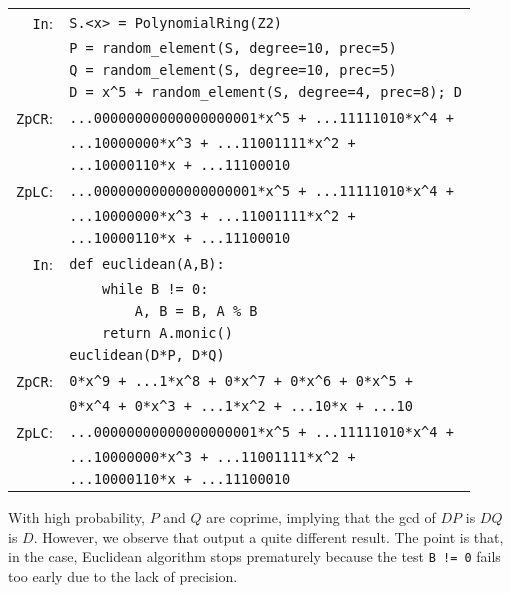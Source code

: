 \documentclass[sigconf]{acmart}
\newcommand{\ZpCR}{\text{\color{output} \rm \tt ZpCR}\xspace}
\newcommand{\cIn}{{\color{input} \tt \phantom{Zp}In}:}
\newcommand{\cZpCR}{{\color{output} \tt ZpCR}:}
\newcommand{\cZpLC}{{\color{output} \tt ZpLC}:}
\theoremstyle{definition}
\begin{document}
{\noindent \small
\begin{tabular}{@{}rl}
\cIn
 & \verb?S.<x> = ?{\color{constructor}\verb?PolynomialRing?}\verb?(?{\color{ring}\verb?Z2?}\verb?)? \\
 & \verb?P = ?{\color{function}\verb?random_element?}\verb?(S, degree=10, prec=5)? \\
 & \verb?Q = ?{\color{function}\verb?random_element?}\verb?(S, degree=10, prec=5)? \\
 & \verb?D = x^5 + ?{\color{function}\verb?random_element?}\verb?(S, degree=4, prec=8); D? \\
\cZpCR
 & \verb?...00000000000000000001*x^5 + ...11111010*x^4 +? \\ 
 & \verb?...10000000*x^3 + ...11001111*x^2 +? \\
 & \verb?...10000110*x + ...11100010? \\
\cZpLC
 & \verb?...00000000000000000001*x^5 + ...11111010*x^4 +? \\ 
 & \verb?...10000000*x^3 + ...11001111*x^2 +? \\
 & \verb?...10000110*x + ...11100010? \\
\cIn
 & {\color{keyword}\verb?def?}\verb? ?{\color{function}\verb?euclidean?}\verb?(A,B):? \\
 & \verb?    ?{\color{keyword}\verb?while?}\verb? B != 0:? \\
 & \verb?        A, B = B, A % B? \\
 & \verb?    ?{\color{keyword}\verb?return?}\verb? A.monic()? \\
 & {\color{function}\verb?euclidean?}\verb?(D*P, D*Q)? \\
\cZpCR
 & \verb?0*x^9 + ...1*x^8 + 0*x^7 + 0*x^6 + 0*x^5 +? \\
 & \verb?0*x^4 + 0*x^3 + ...1*x^2 + ...10*x + ...10? \\
\cZpLC
 & \verb?...00000000000000000001*x^5 + ...11111010*x^4 +? \\ 
 & \verb?...10000000*x^3 + ...11001111*x^2 +? \\
 & \verb?...10000110*x + ...11100010? \\
\end{tabular}}

\smallskip

\noindent
With high probability, $P$ and $Q$ are coprime, implying that the gcd of 
$DP$ is $DQ$ is $D$.  However, we observe that \ZpCR output a quite 
different result. The point is that, in the \ZpCR case, Euclidean 
algorithm stops prematurely because the test \verb?B != 0? fails 
too early due to the lack of precision.
\end{document}

